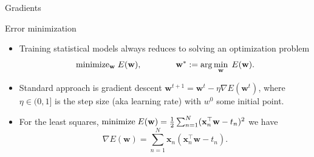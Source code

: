 \documentclass[handout,aspectratio=169]{beamer}
\begin{document}
\begin{frame}{Gradients}
\end{frame}


\begin{frame}{Error minimization}
	\begin{itemize}
		\item Training statistical models always reduces to solving an optimization problem $${\rm minimize}_{\mathbf w}\;E(\mathbf w),\qquad\qquad \mathbf w^*:=\arg\min_{\mathbf w}\;E(\mathbf w).$$
		\item Standard approach is gradient descent $\mathbf w^{t+1}=\mathbf w^t-\eta\nabla E(\mathbf w^t)$, where $\eta\in (0,1]$ is the step size (aka \alert{learning rate}) with $w^0$ some initial point.\\[5mm]
		\item For the least squares, ${\rm minimize}\;E(\mathbf w)=\tfrac12\sum_{n=1}^N(\mathbf x_n^\top \mathbf w-t_n)^2$ we have $$\nabla E(\mathbf w)=\sum_{n=1}^N\mathbf x_n(\mathbf x_n^\top \mathbf w-t_n).$$
	\end{itemize}
\end{frame}
\end{document}
